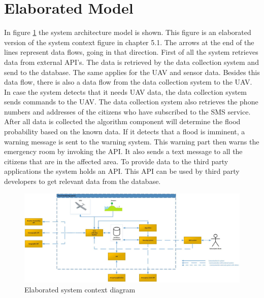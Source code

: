 \section{Elaborated Model}
In figure \ref{fig:system-context-diagram} the system architecture model is shown. This figure is an elaborated version of the system context figure in chapter 5.1. The arrows at the end of the lines represent data flows, going in that direction. 
First of all the system retrieves data from external API's. The data is retrieved by the data collection system and send to the database. The same applies for the UAV and sensor data. Besides this data flow, there is also a data flow from the data collection system to the UAV. In case the system detects that it needs UAV data, the data collection system sends commands to the UAV. The data collection system also retrieves the phone numbers and addresses of the citizens who have subscribed to the SMS service. After all data is collected the algorithm component will determine the flood probability based on the known data. If it detects that a flood is imminent, a warning message is sent to the warning system. This warning part then warns the emergency room by invoking the API. It also sends a text message to all the citizens that are in the affected area. To provide data to the third party applications the system holds an API. This API can be used by third party developers to get relevant data from the database. 
\begin{figure}[H]
\centering
\includegraphics[keepaspectratio=true,width=1\textwidth]{images/Model_v3.jpg}
\caption{Elaborated system context diagram}
\label{fig:system-context-diagram}
\end{figure}